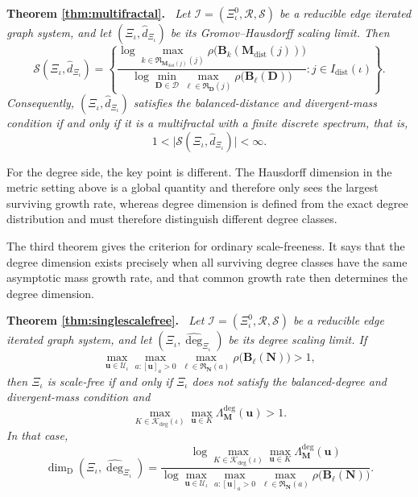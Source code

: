 \documentclass[12pt]{iopart}
\newenvironment{restated}[1]{%
  \par\noindent\textbf{Theorem #1.}\itshape\ }%
  {\par}
\newcommand*{\dist}{d}
\newcommand*{\dimdeg}{\dim_\mathrm{D}}
\begin{document}
\begin{restated}{\ref{thm:multifractal}}
Let $\mathscr I=(\Xi_\iota^0,\mathcal R,\mathcal S)$ be a reducible edge iterated graph system, and let $(\Xi_\iota,\hat\dist_{\Xi_\iota})$ be its Gromov--Hausdorff scaling limit.
Then
\[
\mathscr S(\Xi_\iota,\hat\dist_{\Xi_\iota})
=
\left\{
\frac{
\displaystyle
\log \max_{k\in\mathfrak R_{\mathbf M_{\mathrm{dist}}(j)}(j)}
\rho\big(\mathbf B_k(\mathbf M_{\mathrm{dist}}(j))\big)
}{
\displaystyle
\log \min_{\mathbf D\in\mathcal D}
\max_{\ell\in\mathfrak R_{\mathbf D}(j)}
\rho\big(\mathbf B_\ell(\mathbf D)\big)
}
:
j\in I_{\mathrm{dist}}(\iota)
\right\}.
\]
Consequently, $(\Xi_\iota,\hat\dist_{\Xi_\iota})$ satisfies the balanced-distance and divergent-mass condition if and only if it is a multifractal with a finite discrete spectrum, that is,
\[
1<
\big|
\mathscr S(\Xi_\iota,\hat\dist_{\Xi_\iota})
\big|
<\infty.
\]
\end{restated}

For the degree side, the key point is different.
The Hausdorff dimension in the metric setting above is a global quantity and therefore only sees the largest surviving growth rate, whereas degree dimension is defined from the exact degree distribution and must therefore distinguish different degree classes.



The third theorem gives the criterion for ordinary scale-freeness.
It says that the degree dimension exists precisely when all surviving degree classes have the same asymptotic mass growth rate, and that common growth rate then determines the degree dimension.

\begin{restated}{\ref{thm:singlescalefree}}
Let $\mathscr I=(\Xi_\iota^0,\mathcal R,\mathcal S)$ be a reducible edge iterated graph system, and let $(\Xi_\iota,\hat{\deg}_{\Xi_\iota})$ be its degree scaling limit.
If
\[
\max_{\mathbf u\in\mathcal U_\iota}
\max_{a:[\mathbf u]_a>0}
\max_{\ell\in\mathfrak R_{\mathbf N}(a)}
\rho\big(\mathbf B_\ell(\mathbf N)\big)
>1,
\]
then $\Xi_\iota$ is scale-free if and only if $\Xi_\iota$ does not satisfy the balanced-degree and divergent-mass condition and
\[
\max_{K\in\mathscr K_{\deg}(\iota)}
\max_{\mathbf u\in K}
\Lambda_{\mathbf M}^{\deg}(\mathbf u)
>1.
\]
In that case,
\[
\dimdeg(\Xi_\iota,\hat{\deg}_{\Xi_\iota})
=
\frac{
\displaystyle
\log \max_{K\in\mathscr K_{\deg}(\iota)}
\max_{\mathbf u\in K}
\Lambda_{\mathbf M}^{\deg}(\mathbf u)
}{
\displaystyle
\log \max_{\mathbf u\in\mathcal U_\iota}
\max_{a:[\mathbf u]_a>0}
\max_{\ell\in\mathfrak R_{\mathbf N}(a)}
\rho\big(\mathbf B_\ell(\mathbf N)\big)
}.
\]
\end{restated}
\end{document}
